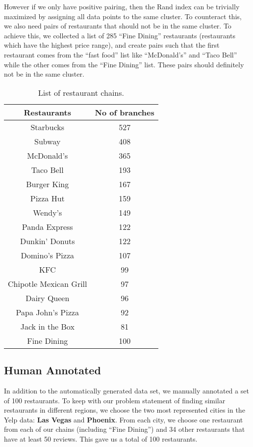 \documentclass{article}
\begin{document}
      However if we only have positive pairing, then the Rand index can be trivially maximized by assigning all data points to the same cluster.
      To counteract this, we also need pairs of restaurants that should not be in the same cluster.
      To achieve this, we collected a list of 285 ``Fine Dining'' restaurants (restaurants which have the highest price range),
      and create pairs such that the first restaurant comes from the ``fast food'' list like ``McDonald's'' and ``Taco Bell'' while the other comes from the ``Fine Dining'' list.
      These pairs should definitely not be in the same cluster.

      \begin{table}
         \begin{center}
            \begin{tabular}{| c | c | }
               \hline
                  Restaurants & No of branches  \\
               \hline
                  Starbucks & 527 \\
                  Subway & 408 \\
                  McDonald's & 365 \\
                  Taco Bell & 193 \\
                  Burger King & 167 \\
                  Pizza Hut & 159 \\
                  Wendy's & 149 \\
                  Panda Express & 122 \\
                  Dunkin' Donuts & 122 \\
                  Domino's Pizza & 107 \\
                  KFC & 99 \\
                  Chipotle Mexican Grill & 97 \\
                  Dairy Queen & 96 \\
                  Papa John's Pizza & 92 \\
                  Jack in the Box & 81\\
                  Fine Dining & 100 \\
               \hline
            \end{tabular}
            \caption{List of restaurant chains.}
            \label{tab:chains}
         \end{center}
      \end{table}

   \subsection{Human Annotated}
      In addition to the automatically generated data set, we manually annotated a set of 100 restaurants.
      To keep with our problem statement of finding similar restaurants in different regions, we choose the two most represented cities in the Yelp data: \textbf{Las Vegas} and \textbf{Phoenix}.
      From each city, we choose one restaurant from each of our chains (including ``Fine Dining'') and 34 other restaurants that have at least 50 reviews.
      This gave us a total of 100 restaurants.
\end{document}

